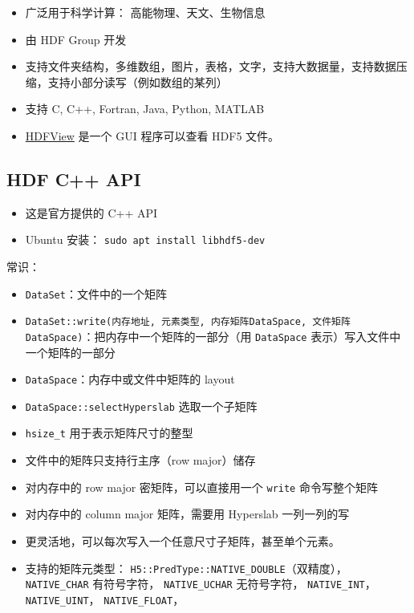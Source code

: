 

\begin{issues}
\issueDraft
\end{issues}

\begin{itemize}
\item 广泛用于科学计算： 高能物理、天文、生物信息
\item 由 HDF Group 开发
\item 支持文件夹结构，多维数组，图片，表格，文字，支持大数据量，支持数据压缩，支持小部分读写（例如数组的某列）
\item 支持 C, C++, Fortran, Java, Python, MATLAB
\item \href{https://www.hdfgroup.org/downloads/hdfview/}{HDFView} 是一个 GUI 程序可以查看 HDF5 文件。
\end{itemize}

\subsection{HDF C++ API}
\begin{itemize}
\item 这是官方提供的 C++ API
\item Ubuntu 安装： \verb|sudo apt install libhdf5-dev|
\end{itemize}

常识：
\begin{itemize}
\item \verb|DataSet|：文件中的一个矩阵
\item \verb|DataSet::write(内存地址, 元素类型, 内存矩阵DataSpace, 文件矩阵DataSpace)|：把内存中一个矩阵的一部分（用 \verb`DataSpace` 表示）写入文件中一个矩阵的一部分
\item \verb|DataSpace|：内存中或文件中矩阵的 layout
\item \verb|DataSpace::selectHyperslab| 选取一个子矩阵
\item \verb`hsize_t` 用于表示矩阵尺寸的整型
\item 文件中的矩阵只支持行主序（row major）储存
\item 对内存中的 row major 密矩阵，可以直接用一个 \verb`write` 命令写整个矩阵
\item 对内存中的 column major 矩阵，需要用 Hyperslab 一列一列的写
\item 更灵活地，可以每次写入一个任意尺寸子矩阵，甚至单个元素。
\item 支持的矩阵元类型： \verb`H5::PredType::NATIVE_DOUBLE`（双精度）， \verb`NATIVE_CHAR` 有符号字符， \verb`NATIVE_UCHAR` 无符号字符， \verb`NATIVE_INT`， \verb`NATIVE_UINT`， \verb`NATIVE_FLOAT`， \verb``
\end{itemize}


